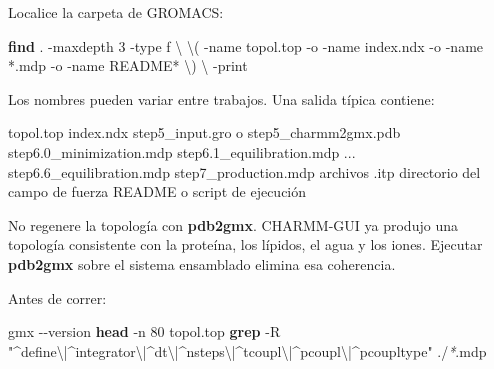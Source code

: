 \documentclass[
  spanish,
  11pt,
  a4paper]{article}
\newenvironment{Shaded}{\begin{snugshade}}{\end{snugshade}}
\newcommand{\AttributeTok}[1]{\textcolor[rgb]{0.13,0.29,0.53}{#1}}
\newcommand{\DataTypeTok}[1]{\textcolor[rgb]{0.13,0.29,0.53}{#1}}
\newcommand{\ExtensionTok}[1]{#1}
\newcommand{\FunctionTok}[1]{\textcolor[rgb]{0.13,0.29,0.53}{\textbf{#1}}}
\newcommand{\NormalTok}[1]{#1}
\newcommand{\PreprocessorTok}[1]{\textcolor[rgb]{0.56,0.35,0.01}{\textit{#1}}}
\newcommand{\StringTok}[1]{\textcolor[rgb]{0.31,0.60,0.02}{#1}}
\begin{document}
Localice la carpeta de GROMACS:

\begin{Shaded}
\begin{Highlighting}[]
\FunctionTok{find}\NormalTok{ . }\AttributeTok{{-}maxdepth}\NormalTok{ 3 }\AttributeTok{{-}type}\NormalTok{ f }\DataTypeTok{\textbackslash{}}
    \DataTypeTok{\textbackslash{}(} \AttributeTok{{-}name} \StringTok{\textquotesingle{}topol.top\textquotesingle{}} \AttributeTok{{-}o} \AttributeTok{{-}name} \StringTok{\textquotesingle{}index.ndx\textquotesingle{}} \AttributeTok{{-}o} \AttributeTok{{-}name} \StringTok{\textquotesingle{}*.mdp\textquotesingle{}} \AttributeTok{{-}o} \AttributeTok{{-}name} \StringTok{\textquotesingle{}README*\textquotesingle{}} \DataTypeTok{\textbackslash{})} \DataTypeTok{\textbackslash{}}
    \AttributeTok{{-}print}
\end{Highlighting}
\end{Shaded}

Los nombres pueden variar entre trabajos. Una salida típica contiene:

\begin{Shaded}
\begin{Highlighting}[]
\NormalTok{topol.top}
\NormalTok{index.ndx}
\NormalTok{step5\_input.gro o step5\_charmm2gmx.pdb}
\NormalTok{step6.0\_minimization.mdp}
\NormalTok{step6.1\_equilibration.mdp}
\NormalTok{...}
\NormalTok{step6.6\_equilibration.mdp}
\NormalTok{step7\_production.mdp}
\NormalTok{archivos .itp}
\NormalTok{directorio del campo de fuerza}
\NormalTok{README o script de ejecución}
\end{Highlighting}
\end{Shaded}

No regenere la topología con \textbf{pdb2gmx}. CHARMM-GUI ya produjo una
topología consistente con la proteína, los lípidos, el agua y los iones.
Ejecutar \textbf{pdb2gmx} sobre el sistema ensamblado elimina esa
coherencia.

Antes de correr:

\begin{Shaded}
\begin{Highlighting}[]
\ExtensionTok{gmx} \AttributeTok{{-}{-}version}
\FunctionTok{head} \AttributeTok{{-}n}\NormalTok{ 80 topol.top}
\FunctionTok{grep} \AttributeTok{{-}R} \StringTok{"\^{}define\textbackslash{}|\^{}integrator\textbackslash{}|\^{}dt\textbackslash{}|\^{}nsteps\textbackslash{}|\^{}tcoupl\textbackslash{}|\^{}pcoupl\textbackslash{}|\^{}pcoupltype"}\NormalTok{ ./}\PreprocessorTok{*}\NormalTok{.mdp}
\end{Highlighting}
\end{Shaded}
\end{document}
